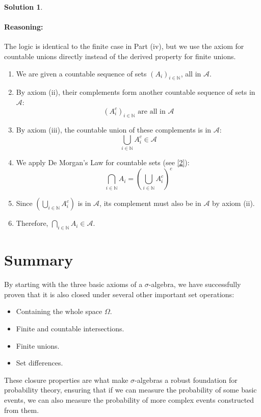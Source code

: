 \documentclass[11pt,a4paper]{article}
\theoremstyle{definition}
\newtheorem*{solution}{Solution}
\begin{document}
\begin{solution}
\paragraph{Reasoning:}
The logic is identical to the finite case in Part (iv), but we use the axiom for countable unions directly instead of the derived property for finite unions.
\begin{enumerate}
    \item We are given a countable sequence of sets $(A_i)_{i \in \mathbb{N}}$, all in $\mathcal{A}$.
    \item By axiom (ii), their complements form another countable sequence of sets in $\mathcal{A}$:
    \[ (A_i^c)_{i \in \mathbb{N}} \text{ are all in } \mathcal{A} \]
    \item By axiom (iii), the countable union of these complements is in $\mathcal{A}$:
    \[ \bigcup_{i \in \mathbb{N}} A_i^c \in \mathcal{A} \]
    \item We apply De Morgan's Law for countable sets (see \hyperlink{note:demorgan}{[2]}):
    \[ \bigcap_{i \in \mathbb{N}} A_i = \left( \bigcup_{i \in \mathbb{N}} A_i^c \right)^c \]
    \item Since $\left( \bigcup_{i \in \mathbb{N}} A_i^c \right)$ is in $\mathcal{A}$, its complement must also be in $\mathcal{A}$ by axiom (ii).
    \item Therefore, $\bigcap_{i \in \mathbb{N}} A_i \in \mathcal{A}$.
\end{enumerate}
\end{solution}

\section{Summary}
By starting with the three basic axioms of a $\sigma$-algebra, we have successfully proven that it is also closed under several other important set operations:
\begin{itemize}
    \item Containing the whole space $\Omega$.
    \item Finite and countable intersections.
    \item Finite unions.
    \item Set differences.
\end{itemize}
These closure properties are what make $\sigma$-algebras a robust foundation for probability theory, ensuring that if we can measure the probability of some basic events, we can also measure the probability of more complex events constructed from them.
\end{document}
